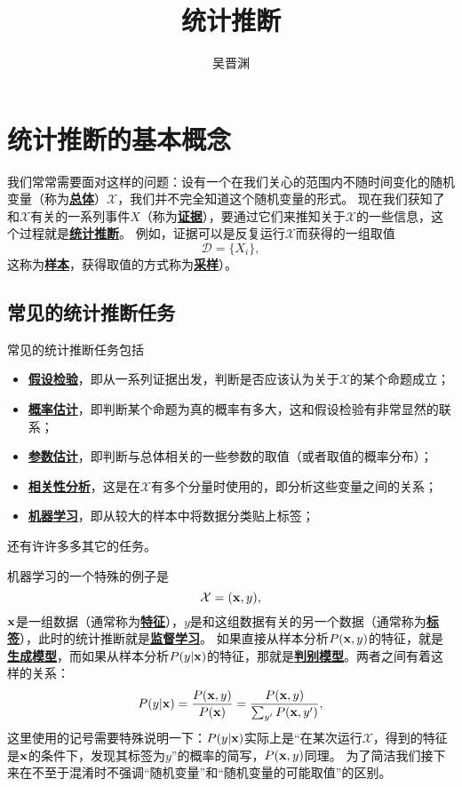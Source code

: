 \documentclass[hyperref, UTF8, a4paper]{ctexart}
\title{统计推断}
\author{吴晋渊}
\newcommand*{\concept}[1]{\underline{\textbf{#1}}}
\begin{document}
\maketitle

\section{统计推断的基本概念}

我们常常需要面对这样的问题：设有一个在我们关心的范围内不随时间变化的随机变量（称为\concept{总体}）$\mathcal{X}$，我们并不完全知道这个随机变量的形式。
现在我们获知了和$\mathcal{X}$有关的一系列事件$X$（称为\concept{证据}），要通过它们来推知关于$\mathcal{X}$的一些信息，这个过程就是\concept{统计推断}。
例如，证据可以是反复运行$\mathcal{X}$而获得的一组取值
\begin{equation}
    \mathcal{D} = \{X_i\},
\end{equation}
这称为\concept{样本}，获得取值的方式称为\concept{采样}）。

\subsection{常见的统计推断任务}

常见的统计推断任务包括
\begin{itemize}
    \item \concept{假设检验}，即从一系列证据出发，判断是否应该认为关于$\mathcal{X}$的某个命题成立；
    \item \concept{概率估计}，即判断某个命题为真的概率有多大，这和假设检验有非常显然的联系；
    \item \concept{参数估计}，即判断与总体相关的一些参数的取值（或者取值的概率分布）；
    \item \concept{相关性分析}，这是在$\mathcal{X}$有多个分量时使用的，即分析这些变量之间的关系；
    \item \concept{机器学习}，即从较大的样本中将数据分类贴上标签；
\end{itemize}
还有许许多多其它的任务。

机器学习的一个特殊的例子是
\begin{equation}
    \mathcal{X} = (\vb{x}, y),
\end{equation}
$\vb{x}$是一组数据（通常称为\concept{特征}），$y$是和这组数据有关的另一个数据（通常称为\concept{标签}），此时的统计推断就是\concept{监督学习}。
如果直接从样本分析$P(\vb{x}, y)$的特征，就是\concept{生成模型}，而如果从样本分析$P(y|\vb{x})$的特征，那就是\concept{判别模型}。两者之间有着这样的关系：
\begin{equation}
    P(y | \vb{x}) = \frac{P(\vb{x}, y)}{P(\vb{x})} = \frac{P(\vb{x}, y)}{\sum_{y'} P(\vb{x}, y')}, 
\end{equation}
这里使用的记号需要特殊说明一下：$P(y | \vb{x})$实际上是“在某次运行$\mathcal{X}$，得到的特征是$\vb{x}$的条件下，发现其标签为$y$”的概率的简写，$P(\vb{x}, y)$同理。
为了简洁我们接下来在不至于混淆时不强调“随机变量”和“随机变量的可能取值”的区别。                                                
\end{document}
